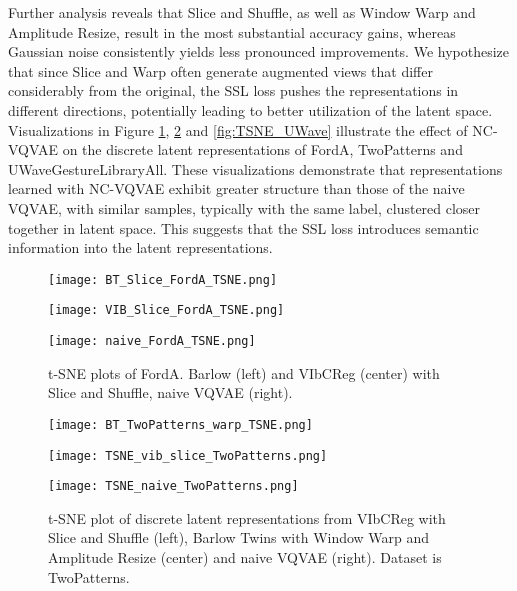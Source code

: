 \documentclass[../../thesis.tex]{subfiles}
\begin{document}
Further analysis reveals that Slice and Shuffle, as well as Window Warp and Amplitude Resize, result in the most substantial accuracy gains, whereas Gaussian noise consistently yields less pronounced improvements. We hypothesize that since Slice and Warp often generate augmented views that differ considerably from the original, the SSL loss pushes the representations in different directions, potentially leading to better utilization of the latent space. Visualizations in Figure \ref{fig:FordA_TSNE}, \ref{fig:TSNE_TwoPatterns} and \ref{fig:TSNE_UWave} illustrate the effect of NC-VQVAE on the discrete latent representations of FordA, TwoPatterns and UWaveGestureLibraryAll. These visualizations demonstrate that representations learned with NC-VQVAE exhibit greater structure than those of the naive VQVAE, with similar samples, typically with the same label, clustered closer together in latent space. This suggests that the SSL loss introduces semantic information into the latent representations.\newline

\begin{figure}[h] 
    \centering
    \begin{minipage}[b]{0.32\textwidth}
        \centering
        \texttt{[image: BT\_Slice\_FordA\_TSNE.png]}
    \end{minipage}
    \hfill
    \begin{minipage}[b]{0.32\textwidth}
        \centering
        \texttt{[image: VIB\_Slice\_FordA\_TSNE.png]}
    \end{minipage}
    \hfill
    \begin{minipage}[b]{0.32\textwidth}
        \centering
        \texttt{[image: naive\_FordA\_TSNE.png]}
    \end{minipage}
    \caption{t-SNE plots of FordA. Barlow (left) and VIbCReg (center) with Slice and Shuffle, naive VQVAE (right).}
    \label{fig:FordA_TSNE}
\end{figure}


\begin{figure}[h]
    \centering
    \begin{minipage}[b]{0.32\textwidth}
        \centering
        \texttt{[image: BT\_TwoPatterns\_warp\_TSNE.png]}
    \end{minipage}
    \hfill
    \begin{minipage}[b]{0.32\textwidth}
        \centering
        \texttt{[image: TSNE\_vib\_slice\_TwoPatterns.png]}
    \end{minipage}
    \hfill
    \begin{minipage}[b]{0.32\textwidth}
        \centering
        \texttt{[image: TSNE\_naive\_TwoPatterns.png]}
    \end{minipage}
    \caption{t-SNE plot of discrete latent representations from VIbCReg with Slice and Shuffle (left), Barlow Twins with Window Warp and Amplitude Resize (center) and naive VQVAE (right). Dataset is TwoPatterns.}
    \label{fig:TSNE_TwoPatterns}
\end{figure}
\end{document}
